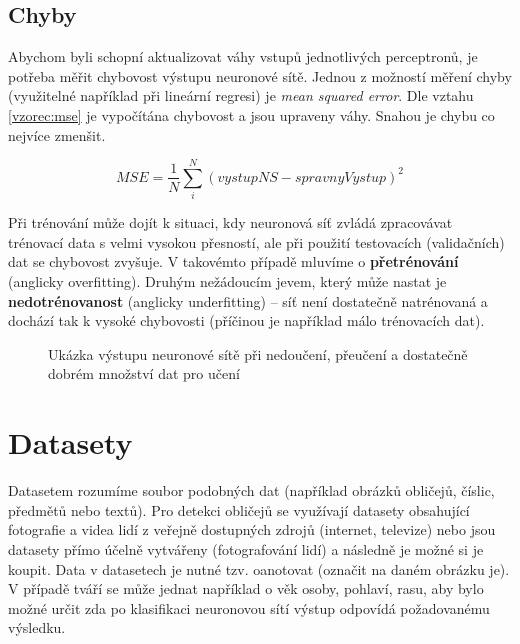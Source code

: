 \subsection*{Chyby}
Abychom byli schopní aktualizovat váhy vstupů jednotlivých perceptronů, je potřeba měřit chybovost výstupu neuronové sítě. Jednou z možností měření chyby (využitelné například při lineární regresi) je \emph{mean squared error}. Dle vztahu \ref{vzorec:mse} je vypočítána chybovost a jsou upraveny váhy. Snahou je chybu co nejvíce zmenšit.

\begin{equation}
  MSE = \frac{1}{N} \sum_{i}^{N} (vystupNS - spravnyVystup)^2
\end{equation}

Při trénování může dojít k situaci, kdy neuronová síť zvládá zpracovávat trénovací data s velmi vysokou přesností, ale při použití testovacích (validačních) dat se chybovost zvyšuje. V takovémto případě mluvíme o \textbf{přetrénování} (anglicky overfitting). Druhým nežádoucím jevem, který může nastat je \textbf{nedotrénovanost} (anglicky underfitting) -- síť není dostatečně natrénovaná a dochází tak k vysoké chybovosti (příčinou je například málo trénovacích dat).


\begin{figure}[H]
  \begin{center}
  \label{obrazek:fitting}
  \caption{Ukázka výstupu neuronové sítě při nedoučení, přeučení a dostatečně dobrém množství dat pro učení}
  \end{center}
\end{figure}


\section{Datasety}
\label{sekce:datasety}
Datasetem rozumíme soubor podobných dat (například obrázků obličejů, číslic, předmětů nebo textů). Pro detekci obličejů se využívají datasety obsahující fotografie a videa lidí z veřejně dostupných zdrojů (internet, televize) nebo jsou datasety přímo účelně vytvářeny (fotografování lidí) a následně je možné si je koupit. Data v datasetech je nutné tzv. oanotovat (označit na daném obrázku je). V případě tváří se může jednat například o věk osoby, pohlaví, rasu, aby bylo možné určit zda po klasifikaci neuronovou sítí výstup odpovídá požadovanému výsledku.

